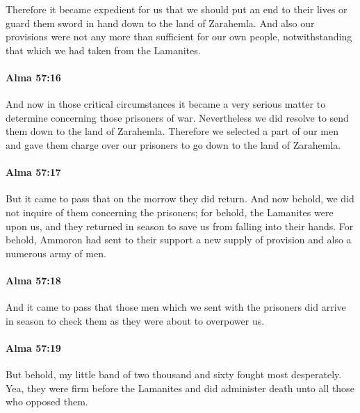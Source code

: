 			Therefore it became expedient for us
			that we should put an end to their lives
			or guard them sword in hand down to the land of Zarahemla.
			And also our provisions were not any more than sufficient for our own people,
			notwithstanding that which we had taken from the Lamanites.

		\paragraph{Alma 57:16} %
			\label{ALMA-57-16}

			And now in those critical circumstances
			it became a very serious matter to determine concerning those prisoners of war.
			Nevertheless we did resolve to send them down to the land of Zarahemla.
			Therefore we selected a part of our men and gave them charge over our prisoners
			to go down to the land of Zarahemla.

		\paragraph{Alma 57:17} %
			\label{ALMA-57-17}

			But it came to pass that on the morrow they did return.
			And now behold, we did not inquire of them concerning the prisoners;
			for behold, the Lamanites were upon us,
			and they returned in season to save us from falling into their hands.
			For behold, Ammoron had sent to their support a new supply of provision
			and also a numerous army of men.

		\paragraph{Alma 57:18} %
			\label{ALMA-57-18}

			And it came to pass that those men which we sent with the prisoners
			did arrive in season to check them as they were about to overpower us.

		\paragraph{Alma 57:19} %
			\label{ALMA-57-19}

			But behold, my little band of two thousand and sixty fought most desperately.
			Yea, they were firm before the Lamanites
			and did administer death unto all those who opposed them.

